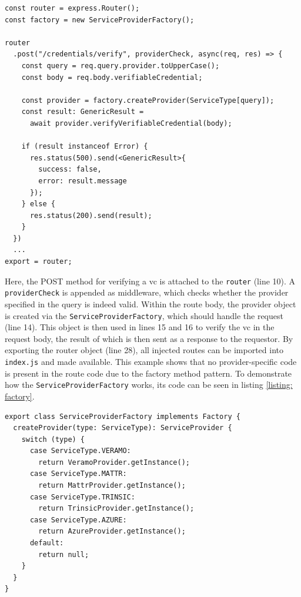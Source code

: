 \begin{lstlisting}[style=ES6, caption=Extract of verifier routes, label={listing: verifier routes}]
const router = express.Router();
const factory = new ServiceProviderFactory();

router
  .post("/credentials/verify", providerCheck, async(req, res) => {
    const query = req.query.provider.toUpperCase();
    const body = req.body.verifiableCredential;
    
    const provider = factory.createProvider(ServiceType[query]);
    const result: GenericResult =
      await provider.verifyVerifiableCredential(body);
      
    if (result instanceof Error) {
      res.status(500).send(<GenericResult>{ 
        success: false, 
        error: result.message 
      });
    } else {
      res.status(200).send(result);
    }
  })
  ...
export = router;
\end{lstlisting}

    Here, the POST method for verifying a \ac{vc} is attached to the \texttt{router} (line 10). A \texttt{providerCheck} is appended as middleware, which checks whether the provider specified in the query is indeed valid. Within the route body, the provider object is created via the \texttt{ServiceProviderFactory}, which should handle the request (line 14). This object is then used in lines 15 and 16 to verify the \ac{vc} in the request body, the result of which is then sent as a response to the requestor. By exporting the router object (line 28), all injected routes can be imported into \texttt{index.js} and made available. This example shows that no provider-specific code is present in the route code due to the factory method pattern. To demonstrate how the \texttt{ServiceProviderFactory} works, its code can be seen in listing \ref{listing: factory}.
    \newpage

\begin{lstlisting}[style=ES6, caption=Extract of service provider factory, label={listing: factory}]
export class ServiceProviderFactory implements Factory {
  createProvider(type: ServiceType): ServiceProvider {
    switch (type) {
      case ServiceType.VERAMO:
        return VeramoProvider.getInstance();
      case ServiceType.MATTR:
        return MattrProvider.getInstance();
      case ServiceType.TRINSIC:
        return TrinsicProvider.getInstance();
      case ServiceType.AZURE:
        return AzureProvider.getInstance();
      default:
        return null;
    }
  }
}
\end{lstlisting}

